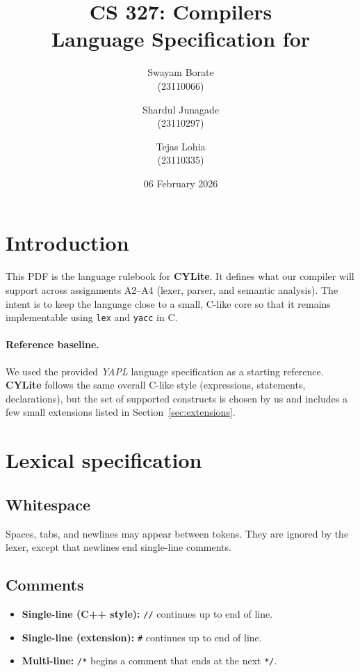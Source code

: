 \documentclass[11pt]{article}
\title{CS 327: Compilers \\Language Specification for \lang}
\author{Swayam Borate\\(23110066) \and Shardul Junagade\\(23110297) \and Tejas Lohia\\(23110335)}
\date{06 February 2026}
\newcommand{\lang}{\textbf{CYLite}}
\begin{document}
\maketitle

\section{Introduction}
This PDF is the language rulebook for \lang{}.
It defines what our compiler will support across assignments A2--A4 (lexer, parser, and semantic analysis).
The intent is to keep the language close to a small, C-like core so that it remains implementable using \texttt{lex} and \texttt{yacc} in C.

\paragraph{Reference baseline.}
We used the provided \emph{YAPL} language specification as a starting reference.
\lang{} follows the same overall C-like style (expressions, statements, declarations), but the set of supported constructs is chosen by us and includes a few small extensions listed in Section~\ref{sec:extensions}.

\section{Lexical specification}
\subsection{Whitespace}
Spaces, tabs, and newlines may appear between tokens.
They are ignored by the lexer, except that newlines end single-line comments.

\subsection{Comments}
\begin{itemize}
	\item \textbf{Single-line (C++ style):} \texttt{//} continues up to end of line.
	\item \textbf{Single-line (extension):} \texttt{\#} continues up to end of line.
	\item \textbf{Multi-line:} \texttt{/*} begins a comment that ends at the next \texttt{*/}.
\end{itemize}
\end{document}
